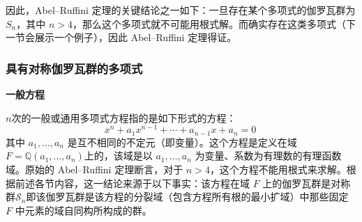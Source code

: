 因此，Abel–Ruffini 定理的关键结论之一如下：一旦存在某个多项式的伽罗瓦群为 $S_n$，其中 $n > 4$，那么这个多项式就不可能用根式解。而确实存在这类多项式（下一节会展示一个例子），因此 Abel–Ruffini 定理得证。
\subsubsection{具有对称伽罗瓦群的多项式}
\textbf{一般方程}

$n$次的一般或通用多项式方程指的是如下形式的方程：
$$
x^n + a_1 x^{n-1} + \cdots + a_{n-1}x + a_n = 0~
$$
其中 $a_1, \ldots, a_n$ 是互不相同的不定元（即变量）。这个方程是定义在域$F = \mathbb{Q}(a_1, \ldots, a_n)$上的，该域是以 $a_1, \ldots, a_n$ 为变量、系数为有理数的有理函数域。原始的 Abel–Ruffini 定理断言，对于 $n > 4$，这个方程不能用根式来求解。根据前述各节内容，这一结论来源于以下事实：该方程在域 $F$ 上的伽罗瓦群是对称群$\mathcal{S}_n$即该伽罗瓦群是该方程的分裂域（包含方程所有根的最小扩域）中那些固定 $F$ 中元素的域自同构所构成的群。
